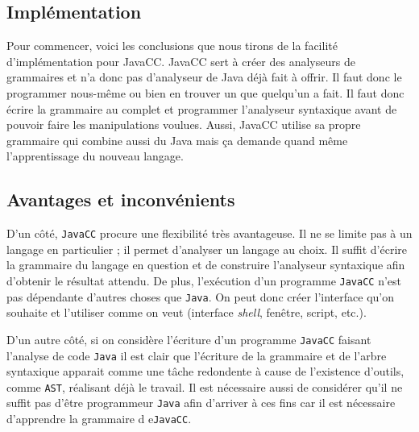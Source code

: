 \documentclass[11pt,french]{article}
\begin{document}
        \subsection{Implémentation} %
        \label{sub:implementation}
        Pour commencer, voici les conclusions que nous tirons de la facilité d'implémentation pour JavaCC.
        JavaCC sert à créer des analyseurs de grammaires et n'a donc pas d'analyseur de Java déjà fait à
        offrir. Il faut donc le programmer nous-même ou bien en trouver un que quelqu'un a fait. Il faut donc
        écrire la grammaire au complet et programmer l'analyseur syntaxique avant de pouvoir faire les manipulations
        voulues. Aussi, JavaCC utilise sa propre grammaire qui combine aussi du Java mais ça demande quand même
        l'apprentissage du nouveau langage.
        \subsection{Avantages et inconvénients} %
        \label{sub:avantages-inconvenients}
            D'un côté, {\tt JavaCC} procure une flexibilité très avantageuse. Il ne se limite pas à
            un langage en particulier ; il permet d'analyser un langage au choix. Il suffit d'écrire
            la grammaire du langage en question et de construire l'analyseur syntaxique afin
            d'obtenir le résultat attendu. De plus, l'exécution d'un programme {\tt JavaCC} n'est
            pas dépendante d'autres choses que {\tt Java}. On peut donc créer l'interface qu'on
            souhaite et l'utiliser comme on veut (interface {\it shell}, fenêtre, script, etc.).

            D'un autre côté, si on considère l'écriture d'un programme {\tt JavaCC} faisant
            l'analyse de code {\tt Java} il est clair que l'écriture de la grammaire et de l'arbre
            syntaxique apparait comme une tâche redondente à cause de l'existence d'outils, comme
            {\tt AST}, réalisant déjà le travail. Il est nécessaire aussi de considérer qu'il ne
            suffit pas d'être programmeur {\tt Java} afin d'arriver à ces fins car il est nécessaire
            d'apprendre la grammaire d e{\tt JavaCC}.
\end{document}
